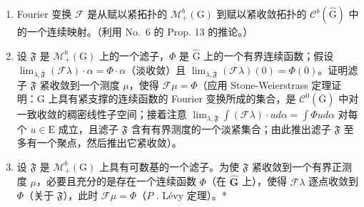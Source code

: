 \begin{enumerate}
\def\labelenumi{\alph{enumi})}
\item
  Fourier 变换 \(\mathcal{F}\) 是从赋以紧拓扑的 \(\mathcal{M}_{+}^{b}(\mathrm{G})\) 到赋以紧收敛拓扑的 \(\mathcal{C}^b (\widehat{\mathrm{G}})\) 中的一个连续映射。（利用 No.~6 的 Prop. 13 的推论。）
\item
  设 \(\mathfrak{F}\) 是 \(\mathcal{M}_+^b (\mathrm{G})\) 上的一个滤子，\(\Phi\) 是 \(\widehat{\mathrm{G}}\) 上的一个有界连续函数；假设 \(\lim_{\lambda ,\mathfrak{F}}(\mathcal{F}\lambda)\cdot \alpha = \Phi \cdot \alpha\)（淡收敛）且 \(\lim_{\lambda ,\mathfrak{F}}(\mathcal{F}\lambda)(0) = \Phi (0)\)。证明滤子 \(\mathfrak{F}\) 紧收敛到一个测度 \(\mu\)，使得 \(\mathcal{F}\mu = \Phi\)（应用 Stone-Weierstrass 定理证明：G 上具有紧支撑的连续函数的 Fourier 变换所成的集合，是 \(\mathcal{C}^0 (\overline{\mathrm{G}})\) 中对一致收敛的稠密线性子空间；接着注意 \(\lim_{\lambda ,\mathfrak{F}}\int (\mathcal{F}\lambda)\cdot u d\alpha = \int \Phi u d\alpha\) 对每个 \(u\in \mathrm{E}\) 成立，且滤子 \(\mathfrak{F}\) 含有有界测度的一个淡紧集合；由此推出滤子 \(\mathfrak{F}\) 至多有一个聚点，然后推出它紧收敛）。
\item
  设 \(\mathfrak{F}\) 是 \(\mathcal{M}_{+}^{b}(\mathrm{G})\) 上具有可数基的一个滤子。为使 \(\mathfrak{F}\) 紧收敛到一个有界正测度 \(\mu\)，必要且充分的是存在一个连续函数 \(\Phi\)（在 \(\widehat{\mathbf{G}}\) 上），使得 \(\mathcal{F}\lambda\) 逐点收敛到 \(\Phi\)（关于 \(\mathfrak{F}\)），此时 \(\mathcal{F}\mu = \Phi\)（\(P\) . Lévy 定理）。*
\end{enumerate}

